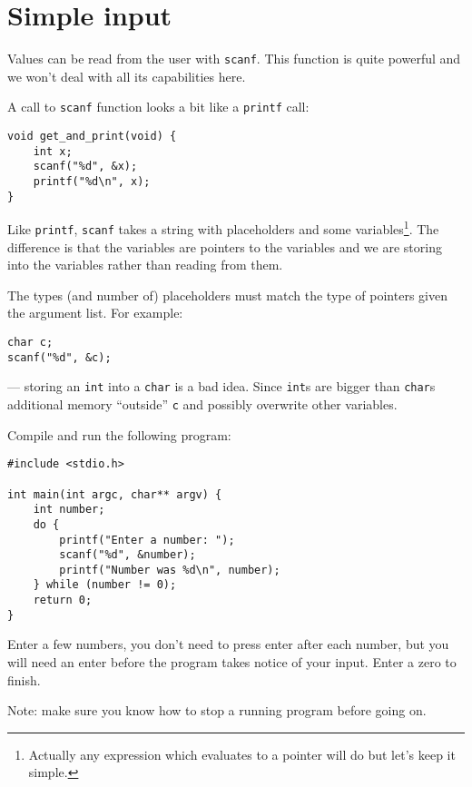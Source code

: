 
\chapter{Simple input}


Values can be read from the user with \texttt{scanf}.
This function is quite powerful and we won't deal with all its capabilities here.

A  call to \texttt{scanf} function looks a bit like a \texttt{printf} call:
\begin{lstlisting}
void get_and_print(void) {
    int x;
    scanf("%d", &x);
    printf("%d\n", x);
}
\end{lstlisting}
Like \texttt{printf}, \texttt{scanf} takes a string with placeholders and some variables\footnote{Actually any expression which evaluates to a pointer will do but let's keep it simple.}.
The difference is that the variables are pointers to the variables and we are storing into the variables
rather than reading from them.

The types (and number of) placeholders must match the type of pointers given the argument list.
For example:
\begin{lstlisting}
char c;
scanf("%d", &c); 
\end{lstlisting}
--- storing an \texttt{int} into a \texttt{char} is a bad idea.
Since \texttt{int}s are bigger than \texttt{char}s additional memory ``outside'' \texttt{c} and possibly overwrite 
other variables.

Compile and run the following program:
\begin{lstlisting}
#include <stdio.h>

int main(int argc, char** argv) {
    int number;
    do {
        printf("Enter a number: "); 
        scanf("%d", &number);
        printf("Number was %d\n", number);
    } while (number != 0);
    return 0;
}
\end{lstlisting}
Enter a few numbers, you don't need to press enter after each number, but you will need an enter before the program 
takes notice of your input.
Enter a zero to finish.

Note: make sure you know how to stop a running program before going on.

